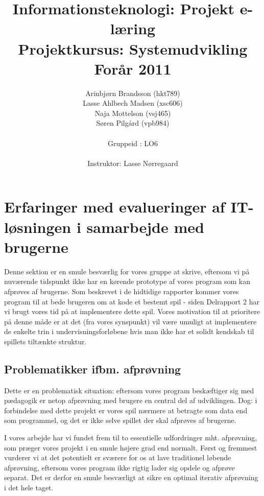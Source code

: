 \documentclass[10pt,a4paper,danish]{article}
\title{Informationsteknologi: Projekt e-læring \\ Projektkursus: Systemudvikling \\Forår 2011}
\author{Arinbjørn Brandsson (hkt789)\\Lasse Ahlbech Madsen (xsc606)\\Naja Mottelson (vsj465)\\Søren Pilgård (vpb984)\\
\\
Gruppeid : LO6\\
\\Instruktor: Lasse Nørregaard}
\begin{document}
\maketitle
\newpage

\tableofcontents
\newpage

\section{Erfaringer med evalueringer af IT-løsningen i samarbejde med brugerne}
Denne sektion er en smule besværlig for vores gruppe at skrive, eftersom vi på nuværende
tidspunkt ikke har en kørende prototype af vores program som kan afprøves af brugerne. 
Som beskrevet i de hidtidige rapporter kommer vores program til at bede brugeren om at kode
et bestemt spil - siden Delrapport 2 har vi brugt vores tid på at implementere dette spil.
Vores motivation til at prioritere på denne måde er at det (fra vores synspunkt) vil være
umuligt at implementere de enkelte trin i undervisningsforløbene hvis man ikke har et 
solidt kendskab til spillets tiltænkte struktur.  

\subsection{Problematikker ifbm. afprøvning}
Dette er en problematisk situation: eftersom vores program beskæftiger sig med pædagogik
er netop afprøvning med brugere en central del af udviklingen. Dog: i forbindelse med dette 
projekt er vores spil nærmere at betragte som data end som 
programmel, og det er ikke selve spillet der skal afprøves af brugerne.

I vores arbejde har vi fundet frem til to essentielle udfordringer mht. afprøvning, som præger 
vores projekt i en smule højere grad end normalt. Først og fremmest vurderer vi at det potentielt 
er sværere for os at lave traditionel løbende afprøvning, eftersom vores 
program ikke rigtig lader sig opdele og afprøve separat. Det er derfor en smule besværligt at 
sikre en optimal iterativ afprøvning i det hele taget. 
\end{document}
